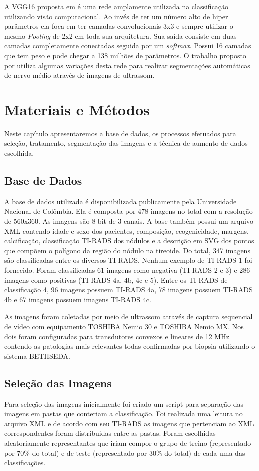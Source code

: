 \documentclass[12pt]{article}
\begin{document}
A VGG16 proposta em \cite{KarenS} é uma rede amplamente utilizada na classificação utilizando visão computacional. Ao invés de ter um número alto de hiper parâmetros ela foca em ter camadas convolucionais 3x3 e sempre utilizar o mesmo \textit{Pooling} de 2x2 em toda sua arquitetura. Sua saída consiste em duas camadas completamente conectadas seguida por um \textit{softmax}. Possui 16 camadas que tem peso e pode chegar a 138 milhões de parâmetros. O trabalho proposto por \cite{AiyueH} utiliza algumas variações desta rede para realizar segmentações automáticas de nervo médio através de imagens de ultrassom.

\section{Materiais e Métodos}
Neste capítulo apresentaremos a base de dados, os processos efetuados para seleção, tratamento, segmentação das imagens e a técnica de aumento de dados escolhida.

\subsection{Base de Dados}
A base de dados utilizada é disponibilizada publicamente pela Universidade Nacional de Colômbia\cite{LinaP}. Ela é composta por 478 imagens no total com a resolução de 560x360. As imagens são 8-bit de 3 canais. A base também possui um arquivo XML contendo idade e sexo dos pacientes, composição, ecogenicidade, margens, calcificação, classificação TI-RADS dos nódulos e a descrição em SVG dos pontos que compõem o polígono da região do nódulo na tireoide. Do total, 347 imagens são classificadas entre os diversos TI-RADS. Nenhum exemplo de TI-RADS 1 foi fornecido. Foram classificadas 61 imagens como negativa (TI-RADS 2 e 3) e 286 imagens como positivas (TI-RADS 4a, 4b, 4c e 5). Entre os TI-RADS de classificação 4, 96 imagens possuem TI-RADS 4a, 78 imagens possuem TI-RADS 4b e 67 imagens possuem imagens TI-RADS 4c.

As imagens foram coletadas por meio de ultrassom através de captura sequencial de vídeo com equipamento TOSHIBA Nemio 30 e TOSHIBA Nemio MX. Nos dois foram configuradas para transdutores convexos e lineares de 12 MHz contendo as patologias mais relevantes todas confirmadas por biopsia utilizando o sistema BETHSEDA.

\subsection{Seleção das Imagens}
Para seleção das imagens inicialmente foi criado um script para separação das imagens em pastas que conteriam a classificação. Foi realizada uma leitura no arquivo XML e de acordo com seu TI-RADS as imagens que pertenciam ao XML correspondentes foram distribuidas entre as pastas. Foram escolhidas aleatoriamente representantes que iriam compor o grupo de treino (representado por 70\% do total) e de teste (representado por 30\% do total) de cada uma das classificações.
\end{document}
